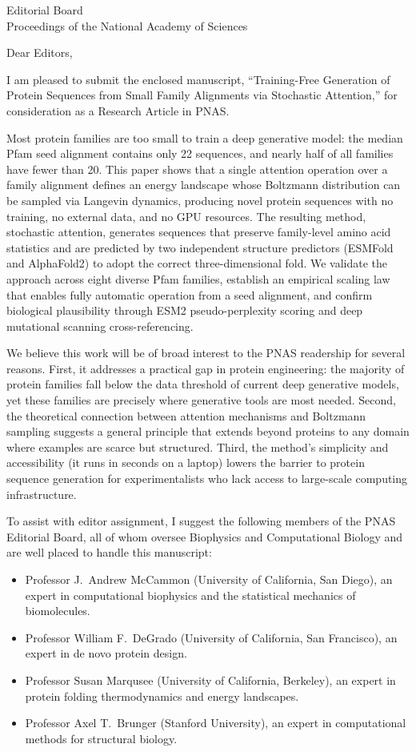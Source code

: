 \documentclass[11pt]{letter}
\date{\today}
\begin{document}
\begin{letter}{Editorial Board\\Proceedings of the National Academy of Sciences}

\opening{Dear Editors,}

I am pleased to submit the enclosed manuscript, ``Training-Free Generation of Protein Sequences from Small Family Alignments via Stochastic Attention,'' for consideration as a Research Article in PNAS.

Most protein families are too small to train a deep generative model: the median Pfam seed alignment contains only 22 sequences, and nearly half of all families have fewer than 20. This paper shows that a single attention operation over a family alignment defines an energy landscape whose Boltzmann distribution can be sampled via Langevin dynamics, producing novel protein sequences with no training, no external data, and no GPU resources. The resulting method, stochastic attention, generates sequences that preserve family-level amino acid statistics and are predicted by two independent structure predictors (ESMFold and AlphaFold2) to adopt the correct three-dimensional fold. We validate the approach across eight diverse Pfam families, establish an empirical scaling law that enables fully automatic operation from a seed alignment, and confirm biological plausibility through ESM2 pseudo-perplexity scoring and deep mutational scanning cross-referencing.

We believe this work will be of broad interest to the PNAS readership for several reasons. First, it addresses a practical gap in protein engineering: the majority of protein families fall below the data threshold of current deep generative models, yet these families are precisely where generative tools are most needed. Second, the theoretical connection between attention mechanisms and Boltzmann sampling suggests a general principle that extends beyond proteins to any domain where examples are scarce but structured. Third, the method's simplicity and accessibility (it runs in seconds on a laptop) lowers the barrier to protein sequence generation for experimentalists who lack access to large-scale computing infrastructure.

To assist with editor assignment, I suggest the following members of the PNAS Editorial Board, all of whom oversee Biophysics and Computational Biology and are well placed to handle this manuscript:
\begin{itemize}
\item Professor J.\ Andrew McCammon (University of California, San Diego), an expert in computational biophysics and the statistical mechanics of biomolecules.
\item Professor William F.\ DeGrado (University of California, San Francisco), an expert in de novo protein design.
\item Professor Susan Marqusee (University of California, Berkeley), an expert in protein folding thermodynamics and energy landscapes.
\item Professor Axel T.\ Brunger (Stanford University), an expert in computational methods for structural biology.
\end{itemize}


\end{letter}
\end{document}
